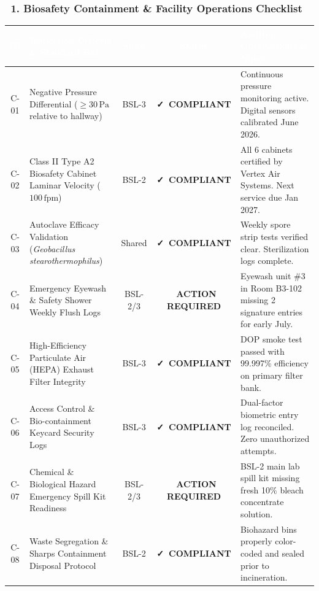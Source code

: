 \documentclass[10pt,a4paper]{scrartcl}
\newcommand{\statuspass}{\colorbox{TealLight}{\textcolor{AlertGreen}{\scriptsize\bfseries\:\faCheck\ COMPLIANT\:}}}
\newcommand{\statusaction}{\colorbox{yellow!20}{\textcolor{AlertAmber}{\scriptsize\bfseries\:\faExclamation\ ACTION REQUIRED\:}}}
\begin{document}
\vspace{2pt}

\subsubsection*{\textcolor{NavyPrimary}{\faCheckSquare\ 1. Biosafety Containment \& Facility Operations Checklist}}

\begin{tcolorbox}[auditcard, left=0pt, right=0pt, top=0pt, bottom=0pt]
\small
{}
\begin{tabularx}{\textwidth}{c X c c X}
\rowcolor{TableHeadBg}
\textcolor{white}{\textbf{ID}} & \textcolor{white}{\textbf{Inspection Criteria \& Standard Ref.}} & \textcolor{white}{\textbf{Suite}} & \textcolor{white}{\textbf{Status}} & \textcolor{white}{\textbf{Auditor Observations \& Notes}} \\
\midrule
C-01 & Negative Pressure Differential ($\ge 30\,\text{Pa}$ relative to hallway) & BSL-3 & \statuspass & Continuous pressure monitoring active. Digital sensors calibrated June 2026. \\
C-02 & Class II Type A2 Biosafety Cabinet Laminar Velocity ($100\,\text{fpm}$) & BSL-2 & \statuspass & All 6 cabinets certified by Vertex Air Systems. Next service due Jan 2027. \\
C-03 & Autoclave Efficacy Validation (\textit{Geobacillus stearothermophilus}) & Shared & \statuspass & Weekly spore strip tests verified clear. Sterilization logs complete. \\
C-04 & Emergency Eyewash \& Safety Shower Weekly Flush Logs & BSL-2/3 & \statusaction & Eyewash unit \#3 in Room B3-102 missing 2 signature entries for early July. \\
C-05 & High-Efficiency Particulate Air (HEPA) Exhaust Filter Integrity & BSL-3 & \statuspass & DOP smoke test passed with 99.997\% efficiency on primary filter bank. \\
C-06 & Access Control \& Bio-containment Keycard Security Logs & BSL-3 & \statuspass & Dual-factor biometric entry log reconciled. Zero unauthorized attempts. \\
C-07 & Chemical \& Biological Hazard Emergency Spill Kit Readiness & BSL-2/3 & \statusaction & BSL-2 main lab spill kit missing fresh 10\% bleach concentrate solution. \\
C-08 & Waste Segregation \& Sharps Containment Disposal Protocol & BSL-2 & \statuspass & Biohazard bins properly color-coded and sealed prior to incineration. \\
\bottomrule
\end{tabularx}
\end{tcolorbox}
\end{document}
